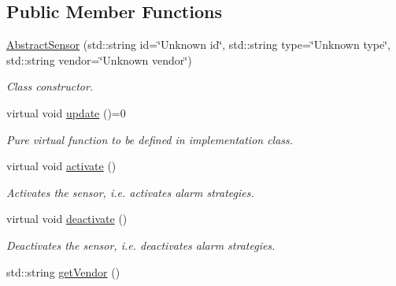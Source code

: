\subsection*{Public Member Functions}
\begin{DoxyCompactItemize}
\item 
\hyperlink{classAbstractSensor_a6ce9232e9b428879bcdee6591eba55e6}{Abstract\+Sensor} (std\+::string id=\char`\"{}Unknown id\char`\"{}, std\+::string type=\char`\"{}Unknown type\char`\"{}, std\+::string vendor=\char`\"{}Unknown vendor\char`\"{})
\begin{DoxyCompactList}\small\item\em Class constructor. \end{DoxyCompactList}\item 
virtual void \hyperlink{classAbstractSensor_a8d0a1908c6aaf67fc7d781e54b49293b}{update} ()=0\hypertarget{classAbstractSensor_a8d0a1908c6aaf67fc7d781e54b49293b}{}\label{classAbstractSensor_a8d0a1908c6aaf67fc7d781e54b49293b}

\begin{DoxyCompactList}\small\item\em Pure virtual function to be defined in implementation class. \end{DoxyCompactList}\item 
virtual void \hyperlink{classAbstractSensor_a0071c6499b1538713bb46d07f0b30ca1}{activate} ()\hypertarget{classAbstractSensor_a0071c6499b1538713bb46d07f0b30ca1}{}\label{classAbstractSensor_a0071c6499b1538713bb46d07f0b30ca1}

\begin{DoxyCompactList}\small\item\em Activates the sensor, i.\+e. activates alarm strategies. \end{DoxyCompactList}\item 
virtual void \hyperlink{classAbstractSensor_a7f921f96118605def806c40139f5496b}{deactivate} ()\hypertarget{classAbstractSensor_a7f921f96118605def806c40139f5496b}{}\label{classAbstractSensor_a7f921f96118605def806c40139f5496b}

\begin{DoxyCompactList}\small\item\em Deactivates the sensor, i.\+e. deactivates alarm strategies. \end{DoxyCompactList}\item 
std\+::string \hyperlink{classAbstractSensor_a8e0920accea462f26cdbda13623ef4c1}{get\+Vendor} ()\hypertarget{classAbstractSensor_a8e0920accea462f26cdbda13623ef4c1}{}\label{classAbstractSensor_a8e0920accea462f26cdbda13623ef4c1}


\end{DoxyCompactItemize}
